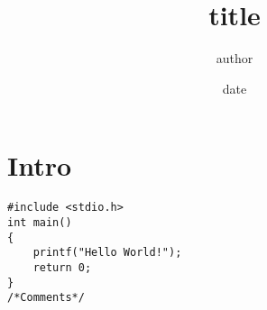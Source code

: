 \documentclass[11pt, letterpaper]{article}
\title{title}
\author{author}
\date{date}
\begin{document}
\maketitle
\section{Intro}
\begin{lstlisting}
#include <stdio.h>
int main()
{
    printf("Hello World!");
    return 0;
}
/*Comments*/

\end{lstlisting}
\end{document}
